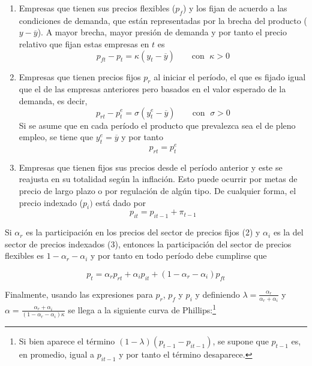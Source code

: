 \documentclass[DeGregorioResumen]{subfiles}
\begin{document}
\begin{enumerate}
	\item Empresas que tienen sus precios flexibles ($p_f$) y los fijan de acuerdo a las condiciones de demanda, que están representadas por la brecha del producto ($y-\overline y$). A mayor brecha, mayor presión de demanda y por tanto el precio relativo que fijan estas empresas en $t$ es
	\begin{equation*}
		p_{ft}-p_t = \kappa(y_t-\overline y) \qquad \text{con }\; \kappa>0
	\end{equation*}
	\item Empresas que tienen precios fijos $p_r$ al iniciar el período, el que es fijado igual que el de las empresas anteriores pero basados en el valor esperado de la demanda, es decir, 
	\begin{equation*}
		p_{rt}-p^e_t = \sigma(y^e_t-\overline y) \qquad \text{con }\; \sigma>0
	\end{equation*}
	Si se asume que en cada período el producto que prevalezca sea el de pleno empleo, se tiene que $y^e_t=\overline y$ y por tanto 
	\begin{equation*}
		p_{rt} = p^e_t
	\end{equation*}
	\item Empresas que tienen fijos sus precios desde el período anterior y este se reajusta en su totalidad según la inflación. Esto puede ocurrir por metas de precio de largo plazo o por regulación de algún tipo. De cualquier forma, el precio indexado ($p_i)$ está dado por
	\begin{equation*}
		p_{it} = p_{it-1}+\pi_{t-1}
	\end{equation*}
\end{enumerate}

Si $\alpha_r$ es la participación en los precios del sector de precios fijos (2) y $\alpha_i$ es la del sector de precios indexados (3), entonces la participación del sector de precios flexibles es $1-\alpha_r-\alpha_i$ y por tanto en todo período debe cumplirse que

\begin{equation*}
	p_t = \alpha_r p_{rt} + \alpha_i p_{it} + (1-\alpha_r-\alpha_i)p_{ft}
\end{equation*}

Finalmente, usando las expresiones para $p_r$, $p_f$ y $p_i$ y definiendo $\lambda=\frac{\alpha_r}{\alpha_r+\alpha_i}$ y $\alpha = \frac{\alpha_r+\alpha_i}{(1-\alpha_r-\alpha_i)\kappa}$ se llega a la siguiente curva de Phillips:\footnote{Si bien aparece el término $(1-\lambda)(p_{t-1} - p_{it-1})$, se supone que $p_{t-1}$ es, en promedio, igual a $p_{it-1}$ y por tanto el término desaparece.}
\end{document}
